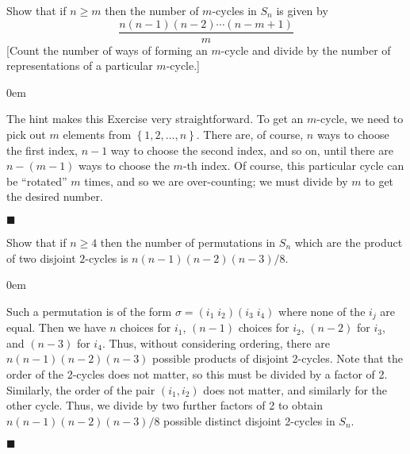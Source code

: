 \documentclass[12pt]{article}
\renewcommand{\qed}{\hfill$\blacksquare$}
\renewenvironment{proof}{\begin{addmargin}[1em]{0em}\begin{newproof}}{\end{newproof}\end{addmargin}\qed}
\newenvironment{problem}[2][Exercise]{\begin{trivlist}
\item[\hskip \labelsep {\bfseries #1}\hskip \labelsep {\bfseries #2.}]}{\end{trivlist}}
\begin{document}
\begin{problem}{1.3.16}
Show that if $n\geq m$ then the number of $m$-cycles in $S_n$ is given by $$ \frac{n\left(n-1\right)\left(n-2\right)\cdots\left(n-m+1\right)}{m} $$ [Count the number of ways of forming an $m$-cycle and divide by the number of representations of a particular $m$-cycle.]
\end{problem}
\begin{proof}
The hint makes this Exercise very straightforward. To get an $m$-cycle, we need to pick out $m$ elements from $\left\{1,2,\ldots,n\right\}$. There are, of course, $n$ ways to choose the first index, $n-1$ way to choose the second index, and so on, until there are $n-(m-1)$ ways to choose the $m$-th index. Of course, this particular cycle can be ``rotated'' $m$ times, and so we are over-counting; we must divide by $m$ to get the desired number.
\end{proof}




\begin{problem}{1.3.17}
  Show that if $n\geq 4$ then the number of permutations in $S_n$ which are the product of two disjoint $2$-cycles is $n\left(n-1\right)\left(n-2\right)\left(n-3\right)/8$.
\end{problem}
\begin{proof}
Such a permutation is of the form $\sigma = \left(i_1\;i_2\right)\left(i_3\;i_4\right)$ where none of the $i_j$ are equal. Then we have $n$ choices for $i_1$, $\left(n-1\right)$ choices for $i_2$, $\left(n-2\right)$ for $i_3$, and $\left(n-3\right)$ for $i_4$. Thus, without considering ordering, there are $ n\left(n-1\right)\left(n-2\right) \left(n-3 \right)$ possible products of disjoint 2-cycles. Note that the order of the 2-cycles does not matter, so this must be divided by a factor of 2. Similarly, the order of the pair $\left(i_1,i_2\right)$ does not matter, and similarly for the other cycle. Thus, we divide by two further factors of 2 to obtain $n\left(n-1\right)\left(n-2\right)\left(n-3\right)/8$ possible distinct disjoint 2-cycles in $S_n$.
\end{proof}
\end{document}
